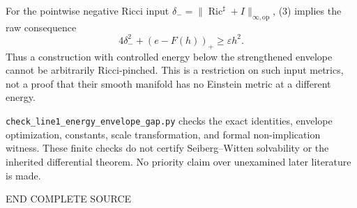 \documentclass[
  10pt,
]{article}
\begin{document}
For the pointwise negative Ricci input
\(\delta_-=\|\operatorname{Ric}^{\sharp}+I\|_{\infty,\mathrm{op}}\), (3)
implies the raw consequence \[
 4\delta_-^2+(e-F(h))_+\ge\varepsilon h^2.
 \tag{18}
\] Thus a construction with controlled energy below the strengthened
envelope cannot be arbitrarily Ricci-pinched. This is a restriction on
such input metrics, not a proof that their smooth manifold has no
Einstein metric at a different energy.

\texttt{check\_line1\_energy\_envelope\_gap.py} checks the exact
identities, envelope optimization, constants, scale transformation, and
formal non-implication witness. These finite checks do not certify
Seiberg--Witten solvability or the inherited differential theorem. No
priority claim over unexamined later literature is made.

END COMPLETE SOURCE
\end{document}

